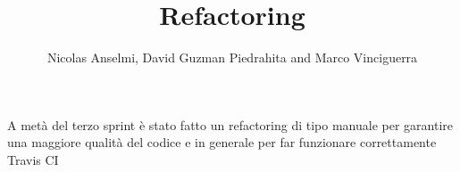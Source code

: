 \documentclass{article}
\title{Refactoring}
\author{Nicolas Anselmi, David Guzman Piedrahita and Marco Vinciguerra}
\begin{document}
\maketitle
A metà del terzo sprint è stato fatto un refactoring di tipo manuale per garantire 
una maggiore qualità del codice e in generale per far funzionare correttamente Travis CI
\end{document}
